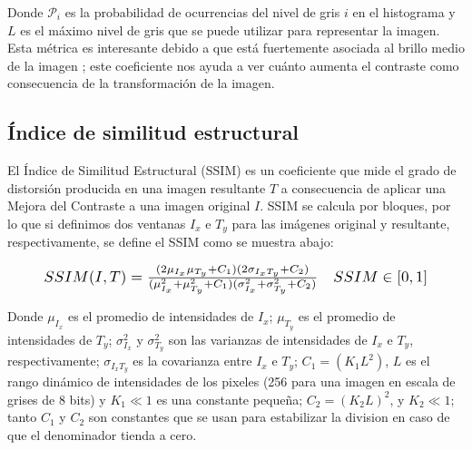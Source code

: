 \documentclass[spanish,twocolumn]{article}
\begin{document}
Donde $\mathcal{P}_i$ es la probabilidad de ocurrencias del nivel de gris $i$ en el histograma y $L$ es el máximo nivel de gris que se puede utilizar para representar la imagen. Esta métrica es interesante debido a que está fuertemente asociada al brillo medio de la imagen \cite{108593}; este coeficiente nos ayuda a ver cuánto aumenta el contraste como consecuencia de la transformación de la imagen.

\subsection{Índice de similitud estructural}
\label{ssec:ssim}

El {Índice de Similitud Estructural (SSIM)} \cite{wang2004image} es un coeficiente que mide el grado de distorsión producida en una imagen resultante $T$ a consecuencia de aplicar una Mejora del Contraste a una imagen original $I$. SSIM se calcula por bloques, por lo que si definimos dos ventanas $I_x$ e $T_y$ para las imágenes original y resultante, respectivamente, se define el SSIM como se muestra abajo:



\begin{equation}\label{eq:ssim}
\resizebox{.9\hsize}{!}
{
$SSIM(I,T)=\frac{(2\mu_{I_x}\mu_{T_y}+C_1)(2\sigma_{I_xT_y}+C_2)}{(\mu_{I_x}^2+\mu_{T_y}^2+C_1)(\sigma_{I_x}^2+\sigma_{T_y}^2+C_2)} \quad SSIM \in [0,1]$
}
\end{equation}

Donde $\mu_{I_x}$ es el promedio de intensidades de $I_x$; $\mu_{T_y}$ es el promedio de intensidades de $T_y$; $\sigma_{I_x}^2$ y $\sigma_{T_y}^2$ son las varianzas de intensidades de $I_x$ e $T_y$, respectivamente; $\sigma_{I_x T_y}$ es la covarianza entre $I_x$ e $T_y$; $C_1=(K_1L^2)$, $L$ es el rango dinámico de intensidades de los pixeles (256 para una imagen en escala de grises de 8 bits) y $K_1 \ll 1$ es una constante pequeña; $C_2=(K_2 L)^2$, y $K_2 \ll 1$; tanto $C_1$ y $C_2$ son constantes que se usan para estabilizar la division en caso de que el denominador tienda a cero.
\end{document}
